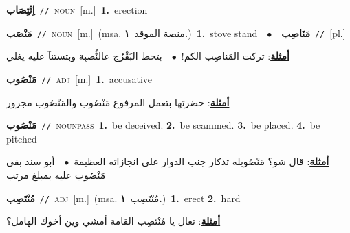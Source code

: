 \documentclass[10pt,a4paper,twoside]{article} %
\begin{document}
\begin{multicols}{2}
{\setlength\topsep{0pt}\textbf{\foreignlanguage{arabic}{اِنْتِصَاب}}\ {\color{gray}\texttt{//}\color{black}}\ \textsc{noun}\ [m.]\ \textbf{1.}~erection\ } \vspace{2mm}

{\setlength\topsep{0pt}\textbf{\foreignlanguage{arabic}{مَنْصَب}}\ {\color{gray}\texttt{//}\color{black}}\ \textsc{noun}\ [m.]\ \color{gray}(msa. \foreignlanguage{arabic}{منصة الموقد}~\foreignlanguage{arabic}{\textbf{١.}})\color{black}\ \textbf{1.}~stove stand\ \ $\bullet$\ \ \setlength\topsep{0pt}\textbf{\foreignlanguage{arabic}{مَنَاصِب}}\ {\color{gray}\texttt{//}\color{black}}\ [pl.]\  \begin{flushright}\color{gray}\foreignlanguage{arabic}{\textbf{\underline{\foreignlanguage{arabic}{أمثلة}}}: تركت المَناصِب الكم!\ $\bullet$\ \  بتحط البَقْرُج عالنُّصبِة وبتستنآ عليه يغلي}\end{flushright}\color{black}} \vspace{2mm}

{\setlength\topsep{0pt}\textbf{\foreignlanguage{arabic}{مَنْصُوب}}\ {\color{gray}\texttt{//}\color{black}}\ \textsc{adj}\ [m.]\ \textbf{1.}~accusative\  \begin{flushright}\color{gray}\foreignlanguage{arabic}{\textbf{\underline{\foreignlanguage{arabic}{أمثلة}}}: حضرتها بتعمل المرفوع مَنْصُوب والمَنْصُوب مجرور}\end{flushright}\color{black}} \vspace{2mm}

{\setlength\topsep{0pt}\textbf{\foreignlanguage{arabic}{مَنْصُوب}}\ {\color{gray}\texttt{//}\color{black}}\ \textsc{noun\textunderscore pass}\ \textbf{1.}~be deceived.  \textbf{2.}~be scammed.  \textbf{3.}~be placed.  \textbf{4.}~be pitched\  \begin{flushright}\color{gray}\foreignlanguage{arabic}{\textbf{\underline{\foreignlanguage{arabic}{أمثلة}}}: قال شو؟ مَنْصُوبله تذكار جنب الدوار على انجازاته العظيمة\ $\bullet$\ \  أبو سند بقى مَنْصُوب عليه بمبلغ مرتب}\end{flushright}\color{black}} \vspace{2mm}

{\setlength\topsep{0pt}\textbf{\foreignlanguage{arabic}{مُنْتَصِب}}\ {\color{gray}\texttt{//}\color{black}}\ \textsc{adj}\ [m.]\ \color{gray}(msa. \foreignlanguage{arabic}{مُنْتَصِب}~\foreignlanguage{arabic}{\textbf{١.}})\color{black}\ \textbf{1.}~erect  \textbf{2.}~hard\  \begin{flushright}\color{gray}\foreignlanguage{arabic}{\textbf{\underline{\foreignlanguage{arabic}{أمثلة}}}: تعال يا مُنْتَصِب القامة أمشي وين أخوك الهامل؟}\end{flushright}\color{black}} \vspace{2mm}


\end{multicols}
\end{document}

